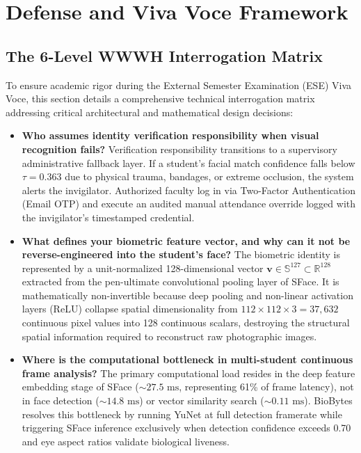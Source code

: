 \chapter{Defense and Viva Voce Framework}

\section{The 6-Level WWWH Interrogation Matrix}
To ensure academic rigor during the External Semester Examination (ESE) Viva Voce, this section details a comprehensive technical interrogation matrix addressing critical architectural and mathematical design decisions:

\begin{itemize}
    \item \textbf{Who assumes identity verification responsibility when visual recognition fails?}
    Verification responsibility transitions to a supervisory administrative fallback layer. If a student's facial match confidence falls below $\tau = 0.363$ due to physical trauma, bandages, or extreme occlusion, the system alerts the invigilator. Authorized faculty log in via Two-Factor Authentication (Email OTP) and execute an audited manual attendance override logged with the invigilator's timestamped credential.

    \item \textbf{What defines your biometric feature vector, and why can it not be reverse-engineered into the student's face?}
    The biometric identity is represented by a unit-normalized 128-dimensional vector $\mathbf{v} \in \mathbb{S}^{127} \subset \mathbb{R}^{128}$ extracted from the pen-ultimate convolutional pooling layer of SFace. It is mathematically non-invertible because deep pooling and non-linear activation layers (ReLU) collapse spatial dimensionality from $112 \times 112 \times 3 = 37,632$ continuous pixel values into 128 continuous scalars, destroying the structural spatial information required to reconstruct raw photographic images.

    \item \textbf{Where is the computational bottleneck in multi-student continuous frame analysis?}
    The primary computational load resides in the deep feature embedding stage of SFace ($\sim 27.5\text{ ms}$, representing 61\% of frame latency), not in face detection ($\sim 14.8\text{ ms}$) or vector similarity search ($\sim 0.11\text{ ms}$). BioBytes resolves this bottleneck by running YuNet at full detection framerate while triggering SFace inference exclusively when detection confidence exceeds 0.70 and eye aspect ratios validate biological liveness.


\end{itemize}
